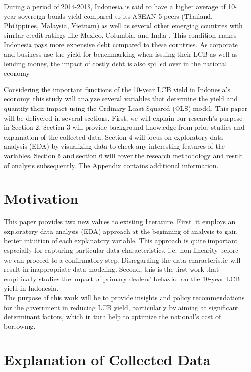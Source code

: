 \documentclass[11pt,a4paper,]{article}
\begin{document}
During a period of 2014-2018, Indonesia is said to have a higher average of 10-year sovereign bonds yield compared to its ASEAN-5 peers (Thailand, Philippines, Malaysia, Vietnam) as well as several other emerging countries with similar credit ratings like Mexico, Columbia, and India \autocite{Muktiyanto2019}. This condition makes Indonesia pays more expensive debt compared to these countries. As corporate and business use the yield for benchmarking when issuing their LCB as well as lending money, the impact of costly debt is also spilled over in the national economy.

Considering the important functions of the 10-year LCB yield in Indonesia's economy, this study will analyze several variables that determine the yield and quantify their impact using the Ordinary Least Squared (OLS) model. This paper will be delivered in several sections. First, we will explain our research's purpose in Section 2. Section 3 will provide background knowledge from prior studies and explanation of the collected data. Section 4 will focus on exploratory data analysis (EDA) by visualizing data to check any interesting features of the variables. Section 5 and section 6 will cover the research methodology and result of analysis subsequently. The Appendix contains additional information.

\hypertarget{motivation}{%
\section{Motivation}\label{motivation}}

This paper provides two new values to existing literature. First, it employs an exploratory data analysis (EDA) approach at the beginning of analysis to gain better intuition of each explanatory variable. This approach is quite important especially for capturing particular data characteristics, i.e.~non-linearity before we can proceed to a confirmatory step. Disregarding the data characteristic will result in inappropriate data modeling.
Second, this is the first work that empirically studies the impact of primary dealers' behavior on the 10-year LCB yield in Indonesia.\\
The purpose of this work will be to provide insights and policy recommendations for the government in reducing LCB yield, particularly by aiming at significant determinant factors, which in turn help to optimize the national's cost of borrowing.

\hypertarget{explanation-of-collected-data}{%
\section{Explanation of Collected Data}\label{explanation-of-collected-data}}
\end{document}
